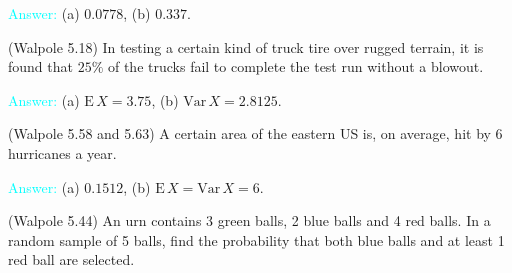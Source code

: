 \documentclass[14pt]{exam}
\def\Var{{\textrm{Var}}\,}
\def\E{{\textrm{E}}\,}
\begin{document}
\begin{questions}
		
		\textcolor{cyan}{Answer:} (a) $0.0778$, (b) $0.337$.
		
		\question
		(Walpole 5.18) In testing a certain kind of truck tire over rugged terrain, it is found that $25\%$ of the trucks fail to complete the test run without a blowout.
		
		
		\textcolor{cyan}{Answer:} (a) $\E X = 3.75$, (b) $\Var X = 2.8125$.
		
		\question
		(Walpole 5.58 and 5.63) A certain area of the eastern US is, on average, hit by 6 hurricanes a year. 
		
		\textcolor{cyan}{Answer:} (a) $0.1512$, (b) $\E X = \Var X = 6$.
		
		\question
		(Walpole 5.44) An urn contains 3 green balls, 2 blue balls and 4 red balls. In a random sample of 5 balls, find the probability that both blue balls and at least 1 red ball are selected.
		

\end{questions}
\end{document}
